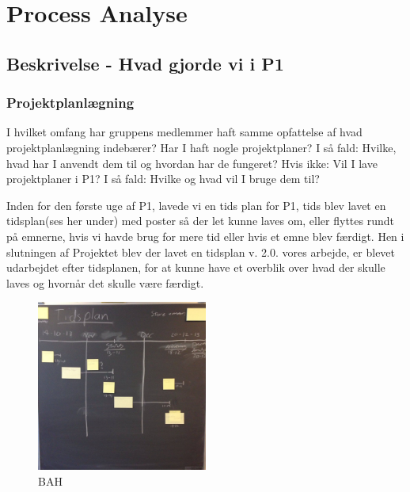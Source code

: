 \documentclass[a4paper,12pt,twoside,openright]{memoir}
\begin{document}
\chapter{Process Analyse}

    \section{Beskrivelse - Hvad gjorde vi i P1} 

        \subsection{Projektplanlægning}
I hvilket omfang har gruppens medlemmer haft samme opfattelse af hvad projektplanlægning indebærer? Har I haft nogle projektplaner? I så fald: Hvilke, hvad har I anvendt dem til og hvordan har de fungeret? Hvis ikke: Vil I lave projektplaner i P1? I så fald: Hvilke og hvad vil I bruge dem til?\newline


Inden for den første uge af P1, lavede vi en tids plan for P1, tids blev lavet en tidsplan(ses her under) med poster så der let kunne laves om, eller flyttes rundt på emnerne, hvis vi havde brug for mere tid eller hvis et emne blev færdigt. Hen i slutningen af Projektet blev der lavet  en tidsplan v. 2.0. vores arbejde, er blevet udarbejdet  efter tidsplanen, for at kunne have et overblik over hvad der skulle laves og hvornår det skulle være færdigt.


            \begin{figure}[ht!]
                \centering
                \includegraphics[width=0.5\textwidth]{Images/9.jpg}
                \caption{BAH}
                \label{4}
            \end{figure}
\end{document}
